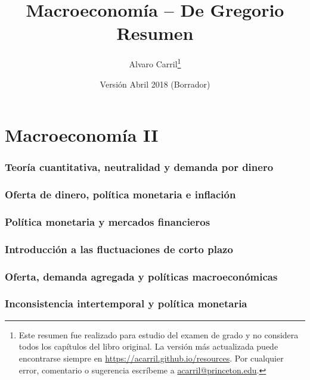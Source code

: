 \documentclass[11pt,twoside]{article}
\title{\textsf{Macroeconomía} -- De Gregorio \\ \Large{Resumen}}
\author{Alvaro Carril\thanks{Este resumen fue realizado para estudio del examen de grado y no considera todos los capítulos del libro original. La versión más actualizada puede encontrarse siempre en \url{https://acarril.github.io/resources}. Por cualquier error, comentario o sugerencia escríbeme a \url{acarril@princeton.edu}.}}
\date{\small Versión Abril 2018 (Borrador)}
\numberwithin{equation}{section}
\numberwithin{figure}{section}
\begin{document}
\maketitle
\thispagestyle{empty}
\setcounter{tocdepth}{1}
\makeatletter
{}
\makeatother
\newpage

\newpage
\setcounter{section}{2}
\newpage

\newpage

\newpage

\newpage

\newpage

\newpage

\newpage

\setcounter{section}{10}
\newpage



\setcounter{section}{14}
\part*{Macroeconomía II}
\section{Teoría cuantitativa, neutralidad y demanda por dinero}
\section{Oferta de dinero, política monetaria e inflación}
\section{Política monetaria y mercados financieros}
\section{Introducción a las fluctuaciones de corto plazo}
\newpage

\newpage

\newpage

\newpage
\section{Oferta, demanda agregada y políticas macroeconómicas}
\setcounter{section}{24}
\section{Inconsistencia intertemporal y política monetaria}
\end{document}

